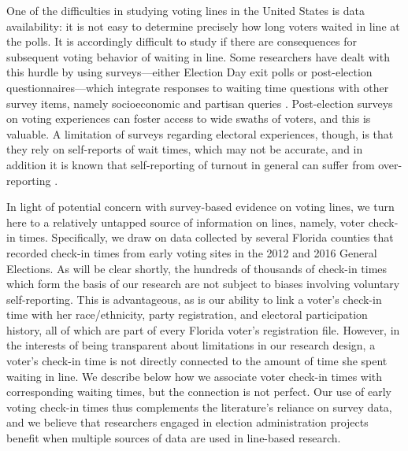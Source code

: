 \documentclass[12pt,titlepage]{article}
\begin{document}
One of the difficulties in studying voting lines in the United States
is data availability: it is not easy to determine precisely how long
voters waited in line at the polls.  It is accordingly difficult to
study if there are consequences for subsequent voting behavior of
waiting in line.  Some researchers have dealt with this hurdle by
using surveys---either Election Day exit polls or post-election
questionnaires---which integrate responses to waiting time questions
with other survey items, namely socioeconomic and partisan queries
\citep{stewart:waitingtovote2012}.  Post-election surveys on voting
experiences can foster access to wide swaths of voters, and this is
valuable.  A limitation of surveys regarding electoral experiences,
though, is that they rely on self-reports of wait times, which may not
be accurate, and in addition it is known that self-reporting of
turnout in general can suffer from over-reporting
\citep{karpbrockington:overreport,bellietal:overreport}.

In light of potential concern with survey-based evidence on voting
lines, we turn here to a relatively untapped source of information on
lines, namely, voter check-in times. Specifically, we draw on data
collected by several Florida counties that recorded check-in times
from early voting sites in the 2012 and 2016 General Elections.  As
will be clear shortly, the hundreds of thousands of check-in times
which form the basis of our research are not subject to biases
involving voluntary self-reporting.  This is advantageous, as is our
ability to link a voter's check-in time with her race/ethnicity, party
registration, and electoral participation history, all of which are
part of every Florida voter's registration file.  However, in the
interests of being transparent about limitations in our research
design, a voter's check-in time is not directly connected to the amount
of time she spent waiting in line.  We describe below how we associate
voter check-in times with corresponding waiting times, but the
connection is not perfect.  Our use of early voting check-in times
thus complements the literature's reliance on survey data, and we
believe that researchers engaged in election administration projects
benefit when multiple sources of data are used in line-based research.
\end{document}
